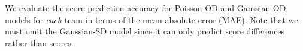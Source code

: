 We evaluate the score prediction accuracy for Poisson-OD and
Gaussian-OD models for \emph{each} team in terms of the mean absolute
error (MAE). Note that we must omit the Gaussian-SD model since it can only
predict score differences rather than scores.




